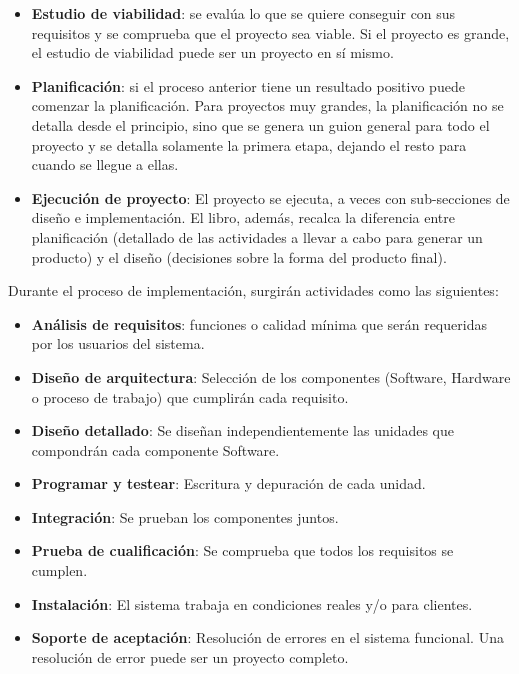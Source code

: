 \documentclass[12pt]{article}
\begin{document}
\begin{itemize}
    \item {\textbf{Estudio de viabilidad}: se evalúa lo que se quiere conseguir con sus requisitos y se comprueba que el proyecto sea viable. Si el proyecto es grande, el estudio de viabilidad puede ser un proyecto en sí mismo.}
    \item {\textbf{Planificación}: si el proceso anterior tiene un resultado positivo puede comenzar la planificación. Para proyectos muy grandes, la planificación no se detalla desde el principio, sino que se genera un guion general para todo el proyecto y se detalla solamente la primera etapa, dejando el resto para cuando se llegue a ellas.}
    \item {\textbf{Ejecución de proyecto}: El proyecto se ejecuta, a veces con sub-secciones de diseño e implementación. El libro, además, recalca la diferencia entre planificación (detallado de las actividades a llevar a cabo para generar un producto) y el diseño (decisiones sobre la forma del producto final).}
\end{itemize}
\newpage

{Durante el proceso de implementación, surgirán actividades como las siguientes:}

\begin{itemize}
    \item {\textbf{Análisis de requisitos}: funciones o calidad mínima que serán requeridas por los usuarios del sistema.}
    \item {\textbf{Diseño de arquitectura}: Selección de los componentes (Software, Hardware o proceso de trabajo) que cumplirán cada requisito.}
    \item {\textbf{Diseño detallado}: Se diseñan independientemente las unidades que compondrán cada componente Software.}
    \item {\textbf{Programar y testear}: Escritura y depuración de cada unidad.}
    \item {\textbf{Integración}: Se prueban los componentes juntos.}
    \item {\textbf{Prueba de cualificación}: Se comprueba que todos los requisitos se cumplen.}
    \item {\textbf{Instalación}: El sistema trabaja en condiciones reales y/o para clientes.}
    \item {\textbf{Soporte de aceptación}: Resolución de errores en el sistema funcional. Una resolución de error puede ser un proyecto completo.}
\end{itemize}
\end{document}
